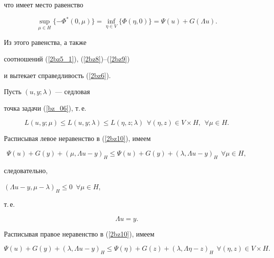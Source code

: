 \begin{pf}
что имеет место равенство 


$$


\sup_{\mu \in H} \{-\Phi^* (0, \mu) \} 


=\inf_{\eta \in V} \{\Phi (\eta, 0) \}=


\Psi (u)+G(\Lambda u) . 


$$


Из этого равенства, а также 


соотношений (\ref{2bz5_1}), (\ref{2bz8})--(\ref{2bz9})


и вытекает справедливость (\ref{2bz6}). 





Пусть $(u, y; \lambda)$ --- седловая 


точка задачи (\ref{bz_06}), т.\,е.


\begin{equation}


L (u, y; \mu) \leq L (u, y; \lambda) \leq L (\eta, z; \lambda)


\ \ \forall (\eta , z) \in V \times H,\ \ \forall \mu \in H.


\label{2bz10}


\end{equation}


Расписывая левое неравенство в (\ref{2bz10}), имеем


$$


\Psi (u)+G(y)+(\mu, \Lambda u-y)_H \leq


\Psi (u)+G(y)+(\lambda, \Lambda u-y)_H \ \ \forall \mu \in H,


$$ 


следовательно, 


$(\Lambda u-y, \mu-\lambda)_H\le0$\, $\forall \mu \in H$,


т.\,е.


\begin{equation}


\Lambda u=y.


\label{2bz11}


\end{equation}


Расписывая правое неравенство в (\ref{2bz10}), имеем


\begin{equation}


\Psi (u)+G(y)+(\lambda , \Lambda u-y)_H \leq 


\Psi (\eta)+G(z)+(\lambda , \Lambda \eta-z)_H 


\ \ \forall (\eta , z) \in V \times H.



\end{equation}
\end{pf}
